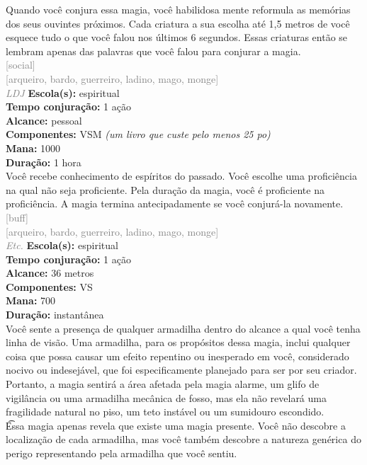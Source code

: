 \documentclass{RPG_Adventure}[2021/10/20]
\begin{document}
{\normalsize Quando você conjura essa magia, você habilidosa mente reformula as memórias dos seus ouvintes próximos. Cada criatura a sua escolha até 1,5 metros de você esquece tudo o que você falou nos últimos 6 segundos. Essas criaturas então se lembram apenas das palavras que você falou para conjurar a magia.\\}
{\scriptsize \textcolor{gray}{[social]\\}}
{\scriptsize \textcolor{gray}{[arqueiro, bardo, guerreiro, ladino, mago, monge]\\}}
{\tiny \textcolor{gray}{\textit{LDJ}}}
{\small \t \textbf{Escola(s):} espiritual\\\t \textbf{Tempo conjuração:} 1 ação\\\t \textbf{Alcance:} pessoal\\\t \textbf{Componentes:} VSM \textit{(um livro que custe pelo menos 25 po)}\\\t \textbf{Mana:} 1000\\\t \textbf{Duração:} 1 hora\\}
{\normalsize Você recebe conhecimento de espíritos do passado. Você escolhe uma proficiência na qual não seja proficiente. Pela duração da magia, você é proficiente na proficiência. A magia termina antecipadamente se você conjurá-la novamente.\\}
{\scriptsize \textcolor{gray}{[buff]\\}}
{\scriptsize \textcolor{gray}{[arqueiro, bardo, guerreiro, ladino, mago, monge]\\}}
{\tiny \textcolor{gray}{\textit{Etc.}}}
{\small \t \textbf{Escola(s):} espiritual\\\t \textbf{Tempo conjuração:} 1 ação\\\t \textbf{Alcance:} 36 metros\\\t \textbf{Componentes:} VS\\\t \textbf{Mana:} 700\\\t \textbf{Duração:} instantânea\\}
{\normalsize Você sente a presença de qualquer armadilha dentro do alcance a qual você tenha linha de visão. Uma armadilha, para os propósitos dessa magia, inclui qualquer coisa que possa causar um efeito repentino ou inesperado em você, considerado nocivo ou indesejável, que foi especificamente planejado para ser por seu criador. Portanto, a magia sentirá a área afetada pela magia alarme, um glifo de vigilância ou uma armadilha mecânica de fosso, mas ela não revelará uma fragilidade natural no piso, um teto instável ou um sumidouro escondido.\\\t Essa magia apenas revela que existe uma magia presente. Você não descobre a localização de cada armadilha, mas você também descobre a natureza genérica do perigo representando pela armadilha que você sentiu.\\}
\end{document}
